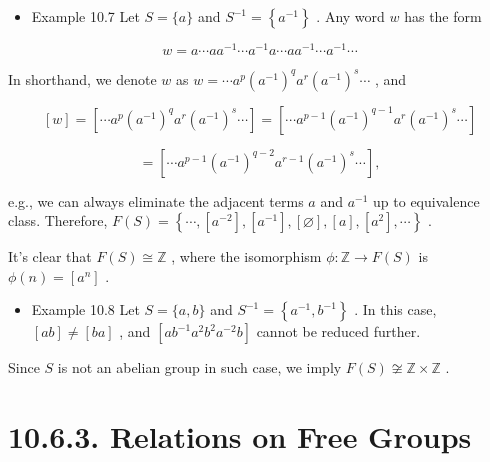 \begin{itemize}
\item Example 10.7 Let \(S = \{ a\}\) and \({S}^{-1} = \left\{  {a}^{-1}\right\}\) . Any word \(w\) has the form
\end{itemize}

\[
w = a\cdots a{a}^{-1}\cdots {a}^{-1}a\cdots a{a}^{-1}\cdots {a}^{-1}\cdots
\]

In shorthand, we denote \(w\) as \(w = \cdots {a}^{p}{\left( {a}^{-1}\right) }^{q}{a}^{r}{\left( {a}^{-1}\right) }^{s}\cdots\) , and

\[
\left\lbrack  w\right\rbrack   = \left\lbrack  {\cdots {a}^{p}{\left( {a}^{-1}\right) }^{q}{a}^{r}{\left( {a}^{-1}\right) }^{s}\cdots }\right\rbrack   = \left\lbrack  {\cdots {a}^{p - 1}{\left( {a}^{-1}\right) }^{q - 1}{a}^{r}{\left( {a}^{-1}\right) }^{s}\cdots }\right\rbrack
\]

\[
= \left\lbrack  {\cdots {a}^{p - 1}{\left( {a}^{-1}\right) }^{q - 2}{a}^{r - 1}{\left( {a}^{-1}\right) }^{s}\cdots }\right\rbrack  ,
\]

e.g., we can always eliminate the adjacent terms \(a\) and \({a}^{-1}\) up to equivalence class. Therefore, \(F\left( S\right)  = \left\{  {\cdots ,\left\lbrack  {a}^{-2}\right\rbrack  ,\left\lbrack  {a}^{-1}\right\rbrack  ,\left\lbrack  \varnothing \right\rbrack  ,\left\lbrack  a\right\rbrack  ,\left\lbrack  {a}^{2}\right\rbrack  ,\cdots }\right\}\) .

It’s clear that \(F\left( S\right)  \cong  \mathbb{Z}\) , where the isomorphism \(\phi  : \mathbb{Z} \rightarrow  F\left( S\right)\) is \(\phi \left( n\right)  = \left\lbrack  {a}^{n}\right\rbrack\) .

\begin{itemize}
\item Example 10.8 Let \(S = \{ a,b\}\) and \({S}^{-1} = \left\{  {{a}^{-1},{b}^{-1}}\right\}\) . In this case, \(\left\lbrack  {ab}\right\rbrack   \neq  \left\lbrack  {ba}\right\rbrack\) , and \(\left\lbrack  {a{b}^{-1}{a}^{2}{b}^{2}{a}^{-2}b}\right\rbrack\) cannot be reduced further.
\end{itemize}

Since \(S\) is not an abelian group in such case, we imply \(F\left( S\right)  ≆ \mathbb{Z} \times  \mathbb{Z}\) .

\section*{10.6.3. Relations on Free Groups}

